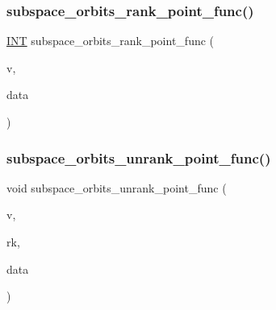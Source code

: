 \subsubsection{\texorpdfstring{subspace\+\_\+orbits\+\_\+rank\+\_\+point\+\_\+func()}{subspace\_orbits\_rank\_point\_func()}}
{\footnotesize\ttfamily \mbox{\hyperlink{galois_8h_a09fddde158a3a20bd2dcadb609de11dc}{I\+NT}} subspace\+\_\+orbits\+\_\+rank\+\_\+point\+\_\+func (\begin{DoxyParamCaption}\item[{\mbox{\hyperlink{galois_8h_a09fddde158a3a20bd2dcadb609de11dc}{I\+NT}} $\ast$}]{v,  }\item[{void $\ast$}]{data }\end{DoxyParamCaption})}

\mbox{\label{subspace__orbits_8_c_a6aa145d65ac1080fffaecc93d6de8e4f}} 
\subsubsection{\texorpdfstring{subspace\+\_\+orbits\+\_\+unrank\+\_\+point\+\_\+func()}{subspace\_orbits\_unrank\_point\_func()}}
{\footnotesize\ttfamily void subspace\+\_\+orbits\+\_\+unrank\+\_\+point\+\_\+func (\begin{DoxyParamCaption}\item[{\mbox{\hyperlink{galois_8h_a09fddde158a3a20bd2dcadb609de11dc}{I\+NT}} $\ast$}]{v,  }\item[{\mbox{\hyperlink{galois_8h_a09fddde158a3a20bd2dcadb609de11dc}{I\+NT}}}]{rk,  }\item[{void $\ast$}]{data }\end{DoxyParamCaption})}

